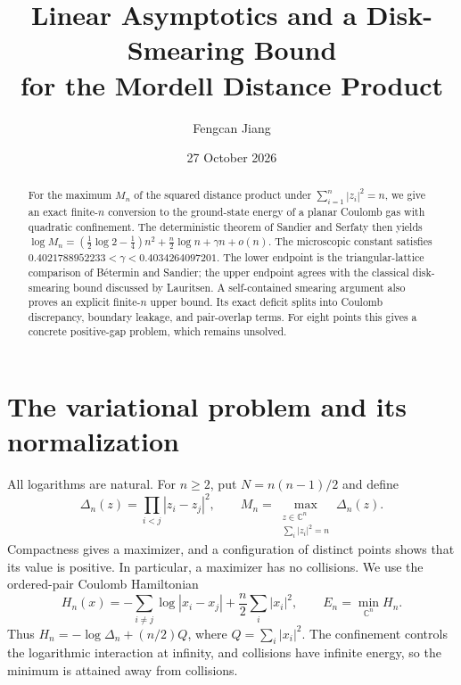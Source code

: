 \documentclass[11pt,a4paper]{article}
\title{Linear Asymptotics and a Disk-Smearing Bound\\
for the Mordell Distance Product}
\author{Fengcan Jiang}
\date{27 October 2026}
\theoremstyle{remark}
\newcommand{\C}{\mathbb C}
\numberwithin{equation}{section}
\begin{document}
\maketitle
\begin{abstract}
For the maximum \(M_n\) of the squared distance product under
\(\sum_{i=1}^n|z_i|^2=n\), we give an exact finite-\(n\) conversion to the
ground-state energy of a planar Coulomb gas with quadratic confinement.
The deterministic theorem of Sandier and Serfaty then yields
\(\log M_n=(\frac12\log2-\frac14)n^2+\frac n2\log n+\gamma n+o(n)\).
The microscopic constant satisfies
\(0.4021788952233<\gamma<0.4034264097201\).
The lower endpoint is the triangular-lattice comparison of
B\'etermin and Sandier; the upper endpoint agrees with the classical
disk-smearing bound discussed by Lauritsen.
A self-contained smearing argument also proves an explicit finite-\(n\)
upper bound. Its exact deficit splits into Coulomb discrepancy,
boundary leakage, and pair-overlap terms. For eight points this gives a
concrete positive-gap problem, which remains unsolved.
\end{abstract}

\section{The variational problem and its normalization}
All logarithms are natural. For \(n\ge2\), put \(N=n(n-1)/2\) and define
\begin{equation}\label{eq:Mn}
 \Delta_n(z)=\prod_{i<j}|z_i-z_j|^2,\qquad
 M_n=\max_{\substack{z\in\C^n\\\sum_i|z_i|^2=n}}\Delta_n(z).
\end{equation}
Compactness gives a maximizer, and a configuration of distinct points
shows that its value is positive. In particular, a maximizer has no
collisions. We use the ordered-pair Coulomb Hamiltonian
\begin{equation}\label{eq:H}
 H_n(x)=-\sum_{i\ne j}\log|x_i-x_j|
              +\frac n2\sum_i|x_i|^2,\qquad E_n=\min_{\C^n}H_n .
\end{equation}
Thus \(H_n=-\log\Delta_n+(n/2)Q\), where \(Q=\sum_i|x_i|^2\).
The confinement controls the logarithmic interaction at infinity, and
collisions have infinite energy, so the minimum is attained away from
collisions.
\end{document}
